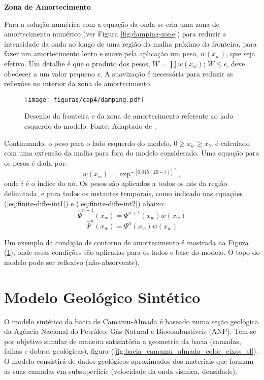 \textbf{Zona de Amortecimento} 

Para a solução numérica com a equação da onda se cria uma zona de amortecimento numérico (ver Figura \ref{fig:damping-zone}) para reduzir a intensidade da onda ao longo de uma região da malha próximo da fronteira, para fazer um amortecimento lento e suave pela aplicação um peso, $w(x_{w})$, que seja efetivo. Um detalhe é que o produto dos pesos, $W=\prod w(x_{w})$; $W\leq \epsilon$, deve obedecer a um valor pequeno $\epsilon$. A suavização é necessária para reduzir as reflexões no interior da zona de amortecimento.

\begin{figure}[H]
\centering
\texttt{[image: figuras/cap4/damping.pdf]}
\caption{Desenho da fronteira e da zona de amortecimento referente ao lado esquerdo do modelo. Fonte: Adaptado de \cite{Bording(1997)}.}
\label{fig:damping}
\end{figure}

Continuando, o peso para o lado esquerdo do modelo, $0\geq x_{w}\geq x_{b}$, é calculado com uma extensão da malha para fora do modelo considerado. Uma equação para os pesos é dada por: 
\begin{equation}
w(x_{w})=\exp^{-[0.015(20-i)]^2},
\label{eq:peso_no}
\end{equation}
onde $i$ é o índice do nó. Os pesos são aplicados a todos os nós da região delimitada, e para todos os instantes temporais, como indicado nas equações (\ref{eq:finite-diffe-int1}) e (\ref{eq:finite-diffe-int2}) abaixo:
\begin{equation}
\hat{\Psi}^{n+1}(x_{w})=\Psi^{n+1}(x_{w})w(x_{w})
\label{eq:finite-diffe-int1}
\end{equation}
\begin{equation}
\hat{\Psi}^{n}(x_{w})=\Psi^{n}(x_{w})w(x_{w})
\label{eq:finite-diffe-int2}
\end{equation}

Um exemplo da condição de contorno de amortecimento é mostrada na Figura (\ref{fig:damping}), onde essas condições são aplicadas para os lados e base do modelo. O topo do modelo pode ser reflexivo (não-absorvente).

\section{Modelo Geológico Sintético}

O modelo sintético da bacia de Camamu-Almada é baseado numa seção geológica da Agência Nacional do Petróleo, Gás Natural e Biocombustíveis (ANP). 
Tem-se por objetivo simular de maneira satisfatória a geometria da bacia (camadas, falhas e dobras geológicas), figura (\ref{fig:bacia_camamu_almada_color_eixos_sl}). 
O modelo consistirá de dados geológicos aproximados dos materiais que formam as suas camadas em subsuperfície (velocidade da onda sísmica, densidade).

